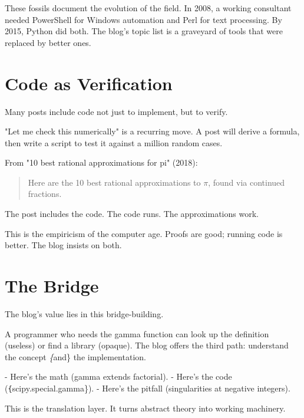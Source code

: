 These fossils document the evolution of the field. In 2008, a working consultant needed PowerShell for Windows automation and Perl for text processing. By 2015, Python did both. The blog's topic list is a graveyard of tools that were replaced by better ones.

\bigskip

\section*{Code as Verification}

Many posts include code not just to implement, but to verify.

"Let me check this numerically" is a recurring move. A post will derive a formula, then write a script to test it against a million random cases.

From "10 best rational approximations for pi" (2018):
\begin{quote}
Here are the 10 best rational approximations to $\pi$, found via continued fractions.
\end{quote}

The post includes the code. The code runs. The approximations work.

This is the empiricism of the computer age. Proofs are good; running code is better. The blog insists on both.

\bigskip

\section*{The Bridge}

The blog's value lies in this bridge-building.

A programmer who needs the gamma function can look up the definition (useless) or find a library (opaque). The blog offers the third path: understand the concept \textit\{and\} the implementation.

- Here's the math (gamma extends factorial).
- Here's the code (\texttt\{scipy.special.gamma\}).
- Here's the pitfall (singularities at negative integers).

This is the translation layer. It turns abstract theory into working machinery.
